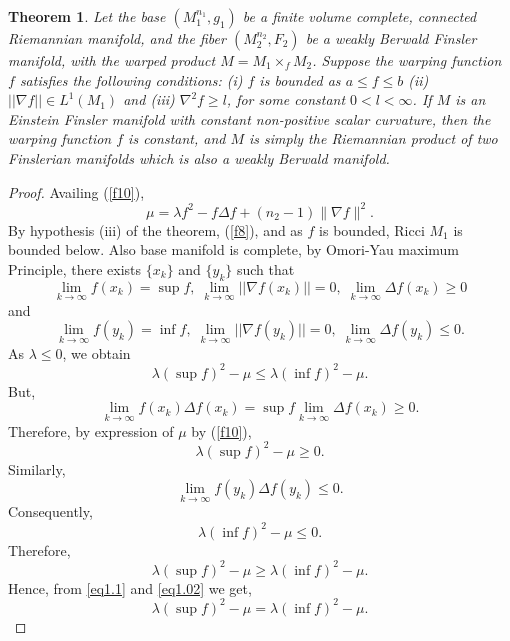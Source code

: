 \documentclass[pdflatex,sn-mathphys-num]{sn-jnl}%
\theoremstyle{thmstyleone}%
\newtheorem{theorem}{Theorem}%
\theoremstyle{thmstyletwo}%
\theoremstyle{thmstylethree}%
\begin{document}
\begin{theorem}\label{main}
		Let the base $(M_1^{n_1}, g_1)$ be a finite volume complete, connected  Riemannian manifold, and the fiber  $(M_2^{n_2}, F_2)$ be a weakly Berwald Finsler manifold, with the warped product $M = M_1 \times_f M_2$. Suppose the warping function $f$ satisfies the following conditions: \emph{(i)}  $f$ is bounded as 
  $a \leq f \leq b$ \emph{(ii)} $||\nabla f|| \in L^1(M_1)$ 
  and (iii) $\nabla^2 f\geq l $, for some constant $ 0<l<\infty$. If $M$ is an Einstein Finsler manifold with constant non-positive scalar curvature, then the warping function $f$ is constant, and $M$ is simply the Riemannian product of two Finslerian manifolds which is also a weakly Berwald manifold. 
\end{theorem}
\begin{proof}
Availing  (\ref{f10}), 
 \begin{equation*}
		\mu=\lambda f^2- f\Delta f + (n_2-1)\|\nabla f\|^2.
	\end{equation*}
	By hypothesis (iii) of the theorem, 
 (\ref{f8}), and as  $f$ is bounded, Ricci $M_1$ is bounded below. Also base manifold is complete, by 
	Omori-Yau maximum Principle,
	there exists $\{x_k\}$ and $\{y_k\}$ such that 
	\begin{equation}
		\displaystyle{\lim_{k\to \infty }} f(x_k)=\sup f, \;\displaystyle{\lim_{k\to \infty }} ||\nabla f(x_k)||=0, \;\displaystyle{\lim_{k\to \infty }}\Delta f(x_k)\ge 0
	\end{equation}
	and
	\begin{equation}
		\displaystyle{\lim_{k\to \infty }} f(y_k)=\inf f, \;\displaystyle{\lim_{k\to \infty }}||\nabla f(y_k)||=0, \;\displaystyle{\lim_{k\to \infty }}\Delta f(y_k)\le 0.
	\end{equation}
	As $\lambda \le 0$, we obtain
	\begin{equation}\label{eq1.1}
		\lambda(\sup f)^2-\mu \le \lambda (\inf f)^2-\mu.
	\end{equation}
	But, 
	$$\lim_{k \rightarrow \infty} f(x_k) \Delta f(x_k)=\sup f \lim_{k \rightarrow \infty} \Delta f(x_k)\ge 0.$$
	Therefore, by expression of $\mu$  by (\ref{f10}),	\begin{equation}\label{eq1.11}
		\lambda(\sup f)^2-\mu \ge 0.
	\end{equation}
	Similarly, 
	\begin{equation}
		\displaystyle{\lim_{k\to \infty}}f(y_k)\Delta f(y_k)\le 0.
	\end{equation}
	Consequently,
	\begin{equation}\label{eq1.21}
		\lambda(\inf f)^2-\mu \le 0.
	\end{equation} 
	Therefore,
	\begin{equation}\label{eq1.02}
		\lambda(\sup f)^2-\mu \ge \lambda(\inf f)^2-\mu.
	\end{equation}
	Hence, from \eqref{eq1.1} and \eqref{eq1.02} we get,
	\begin{equation}\label{kam}
		\lambda(\sup f)^2-\mu = \lambda(\inf f)^2-\mu.
	\end{equation}
	

\end{proof}
\end{document}
